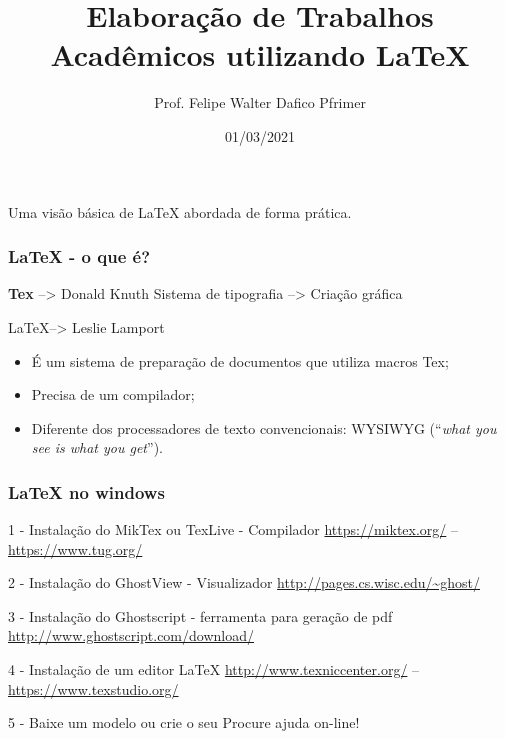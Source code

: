 \documentclass{beamer}
\title[Curso de \LaTeX]{Elaboração de Trabalhos Acadêmicos utilizando LaTeX}
\author[F. Pfrimer]{Prof. Felipe Walter Dafico Pfrimer}
\institute[UTFPR]{Universidade Tecnológica Federal do Paraná}
\date{01/03/2021}
\begin{document}
\begin{frame}
  \titlepage

  \begin{center}
    Uma visão básica de \LaTeX{} abordada de forma prática.
  \end{center}
\end{frame}

\begin{frame}
  \frametitle{\LaTeX{} - o que é?}
  \pause
  \begin{block}{\textbf{Tex} --> Donald Knuth}
    Sistema de tipografia --> Criação gráfica 
  \end{block}
  \pause
  \begin{block}{\LaTeX --> Leslie Lamport}
    \begin{itemize}
        \pause
        \item  É um sistema de preparação de documentos que utiliza macros Tex;
        \pause
        \item  Precisa de um compilador;
        \pause
        \item  Diferente dos processadores de texto convencionais: WYSIWYG (``\textit{what you see is what you get}'').
    \end{itemize}
  \end{block}
\end{frame}

\begin{frame}
    \frametitle{\LaTeX{} no windows}
    \pause
    \begin{block}{1 - Instalação do MikTex ou TexLive - Compilador}
        \url{https://miktex.org/} -- \url{https://www.tug.org/}
    \end{block}
    \pause
    \begin{block}{2 - Instalação do GhostView - Visualizador}
        \url{http://pages.cs.wisc.edu/~ghost/}
    \end{block}
    \pause    
    \begin{block}{3 - Instalação do Ghostscript - ferramenta para geração de pdf}
        \url{http://www.ghostscript.com/download/}
    \end{block}
    \pause    
    \begin{block}{4 - Instalação de um editor \LaTeX{}}
        \url{http://www.texniccenter.org/} -- \url{https://www.texstudio.org/}
    \end{block}
    \pause    
    \begin{block}{5 - Baixe um modelo ou crie o seu}
        Procure ajuda on-line!
    \end{block}
\end{frame}
\end{document}
